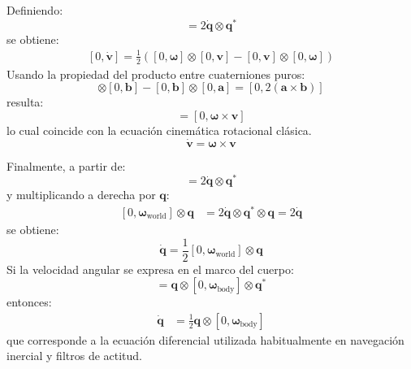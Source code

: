 %
Definiendo:
%
\begin{equation*}
    [0,\boldsymbol{\omega}_{\text{world}}]
    =
    2
    \dot{\mathbf{q}}\otimes
    \mathbf{q}^*
\end{equation*}
%
se obtiene:
%
\begin{equation*}
\begin{aligned}
    [0,\dot{\mathbf{v}}]
    =
    \frac{1}{2}
    \left(
        [0,\boldsymbol{\omega}]\otimes
        [0,\mathbf{v}]
        -
        [0,\mathbf{v}]\otimes
        [0,\boldsymbol{\omega}]
    \right)
\end{aligned}
\end{equation*}
%
Usando la propiedad del producto entre cuaterniones puros:
%
\begin{equation*}
    [0,\mathbf{a}] \otimes
    [0,\mathbf{b}]
    -
    [0,\mathbf{b}]\otimes
    [0,\mathbf{a}]
    =
    [0,2(\mathbf{a}\times\mathbf{b})]
\end{equation*}
%
resulta:
%
\begin{equation*}
    [0,\dot{\mathbf{v}}]
    =
    [0,\boldsymbol{\omega}\times\mathbf{v}]
\end{equation*}%
lo cual coincide con la ecuación cinemática rotacional clásica.
\begin{equation}
    \label{eq:rotacional-clasica}
    \dot{\mathbf{v}} = \boldsymbol{\omega}\times\mathbf{v}
\end{equation}
%

Finalmente, a partir de:
%
\begin{equation*}
    [0,\boldsymbol{\omega}_{\text{world}}]
    =
    2
    \dot{\mathbf{q}}\otimes
    \mathbf{q}^*
\end{equation*}
%
y multiplicando a derecha por $\mathbf{q}$:
%
\begin{equation*}
\begin{aligned}
    [0,\boldsymbol{\omega}_{\text{world}}]\otimes
    \mathbf{q}
    &=
    2
    \dot{\mathbf{q}}\otimes
    \mathbf{q}^*\otimes
    \mathbf{q}
    =
    2\dot{\mathbf{q}}
\end{aligned}
\end{equation*}
%
se obtiene:
%
\begin{equation*}
    \dot{\mathbf{q}}
    =
    \frac{1}{2}
    [0,\boldsymbol{\omega}_{\text{world}}]\otimes
    \mathbf{q}
\end{equation*}
%
Si la velocidad angular se expresa en el marco del cuerpo:
%
\begin{equation*}
    [0,\boldsymbol{\omega}_{\text{world}}]
    =
    \mathbf{q}\otimes
    [0,\boldsymbol{\omega}_{\text{body}}]\otimes
    \mathbf{q}^*
\end{equation*}
%
entonces:
%
\begin{equation}
\begin{aligned}
    \dot{\mathbf{q}}
    &=
    \frac{1}{2}
    \mathbf{q}\otimes
    [0,\boldsymbol{\omega}_{\text{body}}]
    \label{eq:dot_q}
\end{aligned}
\end{equation}
%
que corresponde a la ecuación diferencial utilizada habitualmente en navegación inercial y filtros de actitud.

